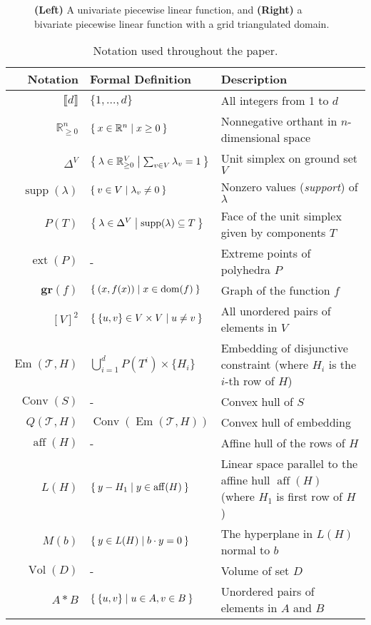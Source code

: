 \documentclass[opre,nonblindrev]{informs3} %
\newcommand{\bbR}{\mathbb{R}}
\newcommand{\calT}{\mathcal{T}}
\newcommand{\aff}{\operatorname{aff}}
\newcommand{\Conv}{\operatorname{Conv}}
\newcommand{\dom}{\operatorname{dom}}
\newcommand{\Em}{\operatorname{Em}}
\newcommand{\gr}{\textbf{gr}}
\newcommand{\ext}{\operatorname{ext}}
\newcommand{\supp}{\operatorname{supp}}
\newcommand{\Vol}{\operatorname{Vol}}
\begin{document}
\begin{figure}[htpb]
{
}
\caption{\textbf{(Left)} A univariate piecewise linear function, and \textbf{(Right)} a bivariate piecewise linear function with a grid triangulated domain.}
\label{fig:pwl-examples}
\end{figure}

\begin{table}[htpb]
\begin{center}%
{\scriptsize
\begin{tabular}{r|l|l}
Notation & Formal Definition & Description \\\hline
$\llbracket d \rrbracket$ & $\{1,\ldots,d\}$ & All integers from 1 to $d$ \\
$\bbR^n_{\geq 0}$ & $\Set{x \in \bbR^n | x \geq 0 }$ & Nonnegative orthant in $n$-dimensional space \\
$\Delta^V$ & $\Set{\lambda \in \bbR^V_{\geq 0} | \sum_{v \in V} \lambda_v = 1 }$ & Unit simplex on ground set $V$ \\
$\supp(\lambda)$ & $\Set{v \in V | \lambda_v \neq 0 }$ & Nonzero values (\emph{support}) of $\lambda$ \\
$P(T)$ & $\Set{\lambda \in \Delta^V | \supp(\lambda) \subseteq T }$ & Face of the unit simplex given by components $T$ \\
$\ext(P)$ & - & Extreme points of polyhedra $P$ \\
$\gr(f)$ & $\Set{(x,f(x)) | x \in \dom(f) }$ & Graph of the function $f$ \\
$[V]^2$ & $\Set{\{u,v\} \in V \times V | u \neq v }$ & All unordered pairs of elements in $V$ \\
$\Em(\calT,H)$ & $\bigcup_{i=1}^d P(T^i) \times \{H_i\}$ &  Embedding of disjunctive constraint (where $H_i$ is the $i$-th row of $H$) \\
$\Conv(S)$ & - & Convex hull of $S$ \\
$Q(\calT,H)$ & $\Conv(\Em(\calT,H))$ & Convex hull of embedding \\
$\aff(H)$ & - & Affine hull of the rows of $H$ \\
$L(H)$ & $\Set{y-H_1 | y \in \aff(H) }$ & Linear space parallel to the affine hull $\aff(H)$ (where $H_1$ is first row of $H$) \\
$M(b)$ & $\Set{y \in L(H) | b \cdot y = 0 }$ & The hyperplane in $L(H)$ normal to $b$ \\
$\Vol(D)$ & - & Volume of set $D$ \\
$A * B$ & $\Set{\{u,v\} | u \in A, v \in B }$ & Unordered pairs of elements in $A$ and $B$
\end{tabular}
\caption{Notation used throughout the paper.}
\label{tab:notation}
}
\end{center}
\end{table}
\end{document}
